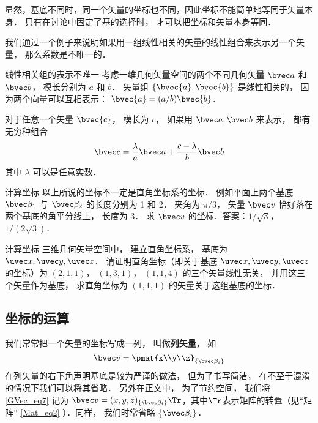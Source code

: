 显然，基底不同时，同一个矢量的坐标也不同，因此坐标不能简单地等同于矢量本身． 只有在讨论中固定了基的选择时， 才可以把坐标和矢量本身等同．

我们通过一个例子来说明如果用一组线性相关的矢量的线性组合来表示另一个矢量， 那么系数是不唯一的．

\begin{example}{线性相关组的表示不唯一}
考虑一维几何矢量空间的两个不同几何矢量 $\bvec a$ 和 $\bvec b$， 模长分别为 $a$ 和 $b$． 矢量组 $\{\bvec{a}, \bvec{b}\}$ 是线性相关的， 因为两个向量可以互相表示： $\bvec{a}=(a/b)\bvec{b}$．

对于任意一个矢量 $\bvec{c}$， 模长为 $c$， 如果用 $\bvec a, \bvec b$ 来表示， 都有无穷种组合
\begin{equation}
\bvec c = \frac{\lambda}{a} \bvec a + \frac{c - \lambda}{b} \bvec b
\end{equation}
其中 $\lambda$ 可以是任意实数．
\end{example}

\begin{exercise}{计算坐标}
以上所说的坐标不一定是直角坐标系的坐标． 例如平面上两个基底 $\bvec \beta_1$ 与 $\bvec \beta_2$ 的长度分别为 1 和 2． 夹角为 $\pi/3$， 矢量 $\bvec v$ 恰好落在两个基底的角平分线上， 长度为 3． 求 $\bvec v$ 的坐标．答案：$1/\sqrt 3$， $1/(2\sqrt 3)$．
\end{exercise}

\begin{exercise}{计算坐标}
三维几何矢量空间中， 建立直角坐标系， 基底为 $\uvec x, \uvec y, \uvec z$． 请证明直角坐标（即关于基底 $\uvec x, \uvec y, \uvec z$ 的坐标）为 $(2, 1, 1)$， $(1, 3, 1)$， $(1, 1, 4)$ 的三个矢量线性无关， 并用这三个矢量作为基底， 求直角坐标为 $(1, 1, 1)$ 的矢量关于这组基底的坐标．
\end{exercise}

\subsection{坐标的运算}
我们常常把一个矢量的坐标写成一列， 叫做\textbf{列矢量}， 如
\begin{equation}\label{GVec_eq7}
\bvec v = \pmat{x\\y\\z}_{\{\bvec\beta_i\}}
\end{equation}
在列矢量的右下角声明基底是较为严谨的做法， 但为了书写简洁， 在不至于混淆的情况下我们可以将其省略． 另外在正文中， 为了节约空间， 我们将\autoref{GVec_eq7} 记为 $\bvec v = (x, y, z)_{\{\bvec\beta_i\}}\Tr$，其中$\Tr$表示矩阵的转置（见“矩阵” \autoref{Mat_eq2} ）．同样， 我们时常省略 $\{\bvec\beta_i\}$．

